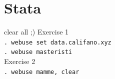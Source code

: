 \documentclass{beamer}
\begin{document}
\section{Stata}
\begin{frame}{clear all ;)}
    Exercise 1 \\
    \texttt{. webuse set data.califano.xyz} \\
    \texttt{. webuse masteristi} \\
    \vspace{1em}
    Exercise 2 \\
    \texttt{. webuse mamme, clear}
\end{frame}
\end{document}
